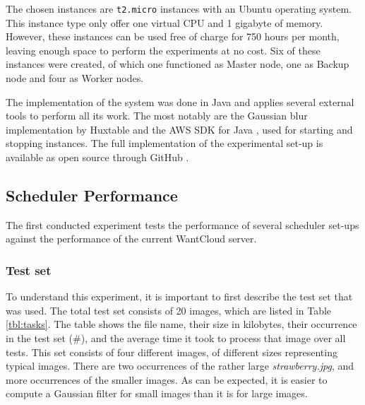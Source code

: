 \documentclass{acm_proc_article-sp}
\begin{document}
The chosen instances are \texttt{t2.micro} instances with an Ubuntu operating system.
This instance type only offer one virtual CPU and 1 gigabyte of memory.
However, these instances can be used free of charge for 750 hours per month, leaving enough space to perform the experiments at no cost.
Six of these instances were created, of which one functioned as Master node, one as Backup node and four as Worker nodes.

The implementation of the system was done in Java and applies several external tools to perform all its work.
The most notably are the Gaussian blur implementation by Huxtable \cite{web:huxtable} and the AWS SDK for Java \cite{web:sdk}, used for starting and stopping instances.
The full implementation of the experimental set-up is available as open source through GitHub \cite{web:git}.

\subsection{Scheduler Performance}
The first conducted experiment tests the performance of several scheduler set-ups against the performance of the current WantCloud server.

\subsubsection{Test set}
To understand this experiment, it is important to first describe the test set that was used.
The total test set consists of 20 images, which are listed in Table \ref{tbl:tasks}.
The table shows the file name, their size in kilobytes, their occurrence in the test set (\#), and the average time it took to process that image over all tests.
This set consists of four different images, of different sizes representing typical images.
There are two occurrences of the rather large \emph{strawberry.jpg}, and more occurrences of the smaller images.
As can be expected, it is easier to compute a Gaussian filter for small images than it is for large images.
\end{document}
